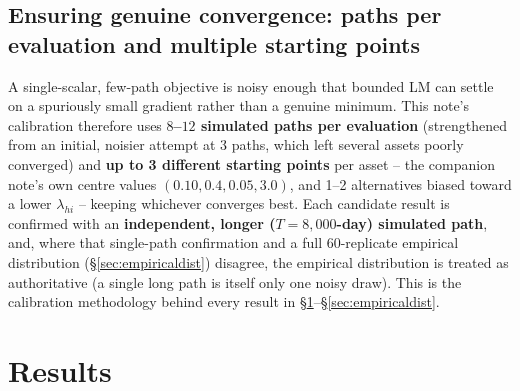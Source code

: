 \documentclass[11pt]{article}
\begin{document}
\subsection{Ensuring genuine convergence: paths per evaluation and multiple starting points}
\label{sec:robustness}
A single-scalar, few-path objective is noisy enough that bounded LM can settle on a
spuriously small gradient rather than a genuine minimum. This note's calibration
therefore uses \textbf{$8$--$12$ simulated paths per evaluation} (strengthened from
an initial, noisier attempt at 3 paths, which left several assets poorly
converged) and \textbf{up to 3 different starting points} per asset -- the
companion note's own centre values $(0.10,0.4,0.05,3.0)$, and 1--2 alternatives
biased toward a lower $\lambda_{hi}$ -- keeping whichever converges best. Each
candidate result is confirmed with an \textbf{independent, longer ($T=8{,}000$-day)
simulated path}, and, where that single-path confirmation and a full 60-replicate
empirical distribution (\S\ref{sec:empiricaldist}) disagree, the empirical
distribution is treated as authoritative (a single long path is itself only one
noisy draw). This is the calibration methodology behind every result in
\S\ref{sec:results}--\S\ref{sec:empiricaldist}.

\section{Results}
\label{sec:results}
\end{document}
